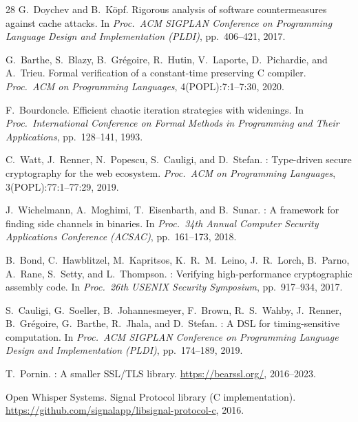 \documentclass{article}
\theoremstyle{definition}
\theoremstyle{remark}
\begin{document}
\begin{thebibliography}{28}
G.~Doychev and B.~K\"{o}pf.
\newblock Rigorous analysis of software countermeasures against cache attacks.
\newblock In \emph{Proc.\ ACM SIGPLAN Conference on Programming Language
  Design and Implementation (PLDI)}, pp.\ 406--421, 2017.

G.~Barthe, S.~Blazy, B.~Gr\'{e}goire, R.~Hutin, V.~Laporte,
  D.~Pichardie, and A.~Trieu.
\newblock Formal verification of a constant-time preserving {C} compiler.
\newblock \emph{Proc.\ ACM on Programming Languages}, 4(POPL):7:1--7:30, 2020.

F.~Bourdoncle.
\newblock Efficient chaotic iteration strategies with widenings.
\newblock In \emph{Proc.\ International Conference on Formal Methods in
  Programming and Their Applications}, pp.\ 128--141, 1993.

C.~Watt, J.~Renner, N.~Popescu, S.~Cauligi, and D.~Stefan.
: Type-driven secure cryptography for the web ecosystem.
\newblock \emph{Proc.\ ACM on Programming Languages}, 3(POPL):77:1--77:29,
  2019.

J.~Wichelmann, A.~Moghimi, T.~Eisenbarth, and B.~Sunar.
: A framework for finding side channels in binaries.
\newblock In \emph{Proc.\ 34th Annual Computer Security Applications
  Conference (ACSAC)}, pp.\ 161--173, 2018.

B.~Bond, C.~Hawblitzel, M.~Kapritsos, K.~R.~M.~Leino, J.~R.~Lorch,
  B.~Parno, A.~Rane, S.~Setty, and L.~Thompson.
: Verifying high-performance cryptographic assembly code.
\newblock In \emph{Proc.\ 26th USENIX Security Symposium},
  pp.\ 917--934, 2017.

S.~Cauligi, G.~Soeller, B.~Johannesmeyer, F.~Brown, R.~S.~Wahby,
  J.~Renner, B.~Gr\'{e}goire, G.~Barthe, R.~Jhala, and D.~Stefan.
: A {DSL} for timing-sensitive computation.
\newblock In \emph{Proc.\ ACM SIGPLAN Conference on Programming Language
  Design and Implementation (PLDI)}, pp.\ 174--189, 2019.

T.~Pornin.
: A smaller {SSL/TLS} library.
\newblock \url{https://bearssl.org/}, 2016--2023.

Open Whisper Systems.
\newblock Signal Protocol library ({C} implementation).
\newblock \url{https://github.com/signalapp/libsignal-protocol-c}, 2016.

\end{thebibliography}
\end{document}
